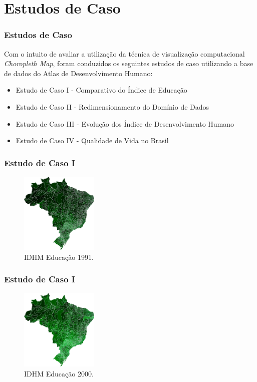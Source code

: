 \documentclass[aspectratio=169]{beamer}
\begin{document}
\section{Estudos de Caso}
\begin{frame}
\frametitle{Estudos de Caso}
\justifying

Com o intuito de avaliar a utilização da técnica de visualização computacional \textit{Choropleth Map}, foram conduzidos os seguintes estudos de caso utilizando a base de dados do Atlas de Desenvolvimento Humano:

\begin{itemize}
\item Estudo de Caso I - Comparativo do Índice de Educação
\item Estudo de Caso II - Redimensionamento do Domínio de Dados
\item Estudo de Caso III - Evolução dos Índice de Desenvolvimento Humano
\item Estudo de Caso IV - Qualidade de Vida no Brasil
\end{itemize}


\end{frame}

\begin{frame}
\frametitle{Estudo de Caso I}
\justifying

\begin{figure}
\centering
\includegraphics[width=0.33\textwidth]{images/educacao-1991.png}
\caption{IDHM Educação 1991.}
\end{figure}


\end{frame}

\begin{frame}
\frametitle{Estudo de Caso I}
\justifying

\begin{figure}
\centering
\includegraphics[width=0.33\textwidth]{images/educacao-2000.png}
\caption{IDHM Educação 2000.}
\end{figure}


\end{frame}
\end{document}
